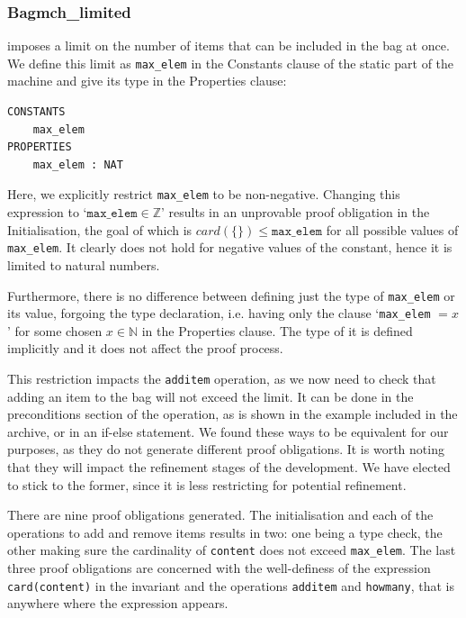 \documentclass[12pt,journal,duplex]{IEEEtran}
\begin{document}
	\subsubsection{Bagmch\_limited} imposes a limit on the number of items that can be included in the bag at once. We define this limit as \texttt{max\_elem} in the Constants clause of the static part of the machine and give its type in the Properties clause:

\begin{lstlisting}
CONSTANTS
	max_elem
PROPERTIES
	max_elem : NAT
\end{lstlisting}

	Here, we explicitly restrict \texttt{max\_elem} to be non-negative. Changing this expression to `$\texttt{max\_elem} \in \mathbb{Z}$' results in an unprovable proof obligation in the Initialisation, the goal of which is $card(\{\}) \leq \texttt{max\_elem}$ for all possible values of \texttt{max\_elem}. It clearly does not hold for negative values of the constant, hence it is limited to natural numbers.

	Furthermore, there is no difference between defining just the type of \texttt{max\_elem} or its value, forgoing the type declaration, i.e. having only the clause `\texttt{max\_elem} $= x$' for some chosen $x \in \mathbb{N}$ in the Properties clause. The type of it is defined implicitly and it does not affect the proof process. 

	This restriction impacts the \texttt{additem} operation, as we now need to check that adding an item to the bag will not exceed the limit. It can be done in the preconditions section of the operation, as is shown in the example included in the archive, or in an if-else statement. We found these ways to be equivalent for our purposes, as they do not generate different proof obligations. It is worth noting that they will impact the refinement stages of the development. We have elected to stick to the former, since it is less restricting for potential refinement.

	There are nine proof obligations generated. The initialisation and each of the operations to add and remove items results in two: one being a type check, the other making sure the cardinality of \texttt{content} does not exceed \texttt{max\_elem}. The last three proof obligations are concerned with the well-definess of the expression \texttt{card(content)} in the invariant and the operations \texttt{additem} and \texttt{howmany}, that is anywhere where the expression appears.
\end{document}
